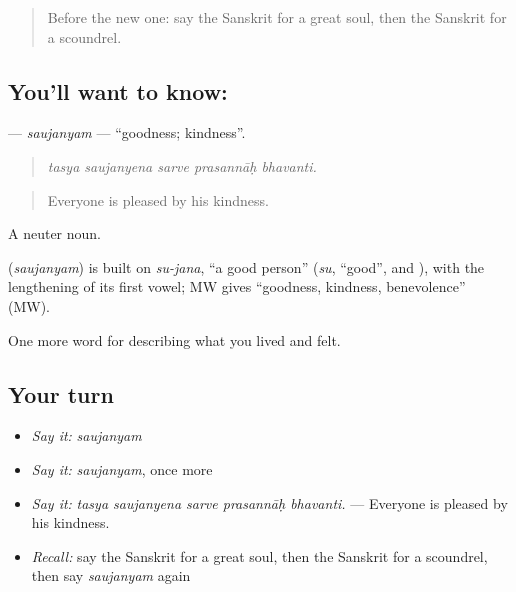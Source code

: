 \label{lesson:SA-C461-saujanyam}



\begin{quote}
Before the new one: say the Sanskrit for a great soul, then the Sanskrit for a scoundrel.
\end{quote}

\subsection*{You'll want to know: }
\textbf{} — \emph{saujanyam} — \textquotedblleft{}goodness; kindness\textquotedblright{}.

\begin{quote}
    
\end{quote}

\begin{quote}
\emph{tasya saujanyena sarve prasannāḥ bhavanti.}
\end{quote}

\begin{quote}
Everyone is pleased by his kindness.
\end{quote}

A neuter noun.

\begin{cousinweb}
\textbf{} (\emph{saujanyam}) is built on \emph{su-jana}, \textquotedblleft{}a good person\textquotedblright{} (\emph{su}, \textquotedblleft{}good\textquotedblright{}, and \textbf{}), with the lengthening of its first vowel; MW gives \textquotedblleft{}goodness, kindness, benevolence\textquotedblright{} (MW).
\end{cousinweb}

\begin{grammarlens}[title={What you've built}]
One more word for describing what you lived and felt.
\end{grammarlens}

\subsection*{Your turn}
\begin{itemize}
\raggedright
  \item \emph{Say it:} \emph{saujanyam}
  \item \emph{Say it:} \emph{saujanyam}, once more
  \item \emph{Say it:} \emph{tasya saujanyena sarve prasannāḥ bhavanti.} — Everyone is pleased by his kindness.
  \item \emph{Recall:} say the Sanskrit for a great soul, then the Sanskrit for a scoundrel, then say \emph{saujanyam} again
\end{itemize}


